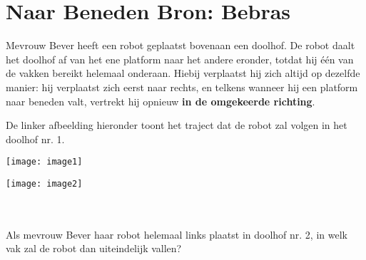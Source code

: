 \documentclass[12pt, a4paper]{article}
\begin{document}
	\begin{minipage}{\textwidth}
		\section{Naar Beneden \hfill\small Bron: Bebras}
			Mevrouw Bever heeft een robot geplaatst bovenaan een doolhof. De robot daalt het doolhof af van het ene platform naar het andere eronder, totdat hij één van de vakken bereikt helemaal onderaan. Hiebij verplaatst hij zich altijd op dezelfde manier: hij verplaatst zich eerst naar rechts, en telkens wanneer hij een platform naar beneden valt, vertrekt hij opnieuw \textbf{in de omgekeerde richting}.
			
			De linker afbeelding hieronder toont het traject dat de robot zal volgen in het doolhof nr. 1. \\
	
			\begin{minipage}{0.49\linewidth}
				\texttt{[image: image1]}
			\end{minipage} \hfill
			\begin{minipage}{0.49\linewidth}
				\texttt{[image: image2]}
			\end{minipage} \\ \\

			Als mevrouw Bever haar robot helemaal links plaatst in doolhof nr. 2, in welk vak zal de robot dan uiteindelijk vallen?

	\end{minipage} \\ \\
	
\end{document}
